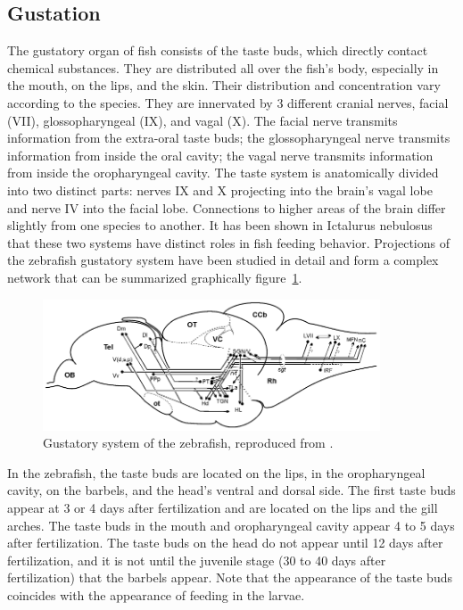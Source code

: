     \subsection{Gustation}
    The gustatory organ of fish consists of the taste buds, which directly contact chemical substances. They are distributed all over the fish's body, especially in the mouth, on the lips, and the skin. Their distribution and concentration vary according to the species. They are innervated by 3 different cranial nerves, facial (VII), glossopharyngeal (IX), and vagal (X). The facial nerve transmits information from the extra-oral taste buds; the glossopharyngeal nerve transmits information from inside the oral cavity; the vagal nerve transmits information from inside the oropharyngeal cavity. The taste system is anatomically divided into two distinct parts: nerves IX and X projecting into the brain's vagal lobe and nerve IV into the facial lobe. Connections to higher areas of the brain differ slightly from one species to another. It has been shown in Ictalurus nebulosus \cite{datema1971structures} that these two systems have distinct roles in fish feeding behavior. Projections of the zebrafish gustatory system have been studied in detail \cite{yanez2017gustatory} and form a complex network that can be summarized graphically figure~\ref{gustatory_connection_schematic}.

    \begin{figure}[!h]
      \centering
      \includegraphics[width=10cm]{part_2/assets/gustatory_connection_schematic.png}
      \caption{Gustatory system of the zebrafish, reproduced from \cite{yanez2017gustatory}.}
      \label{gustatory_connection_schematic}
    \end{figure}

    In the zebrafish, the taste buds are located on the lips, in the oropharyngeal cavity, on the barbels, and the head's ventral and dorsal side. The first taste buds appear at 3 or 4 days after fertilization and are located on the lips and the gill arches. The taste buds in the mouth and oropharyngeal cavity appear 4 to 5 days after fertilization. The taste buds on the head do not appear until 12 days after fertilization, and it is not until the juvenile stage (30 to 40 days after fertilization) that the barbels appear. Note that the appearance of the taste buds coincides with the appearance of feeding in the larvae.

